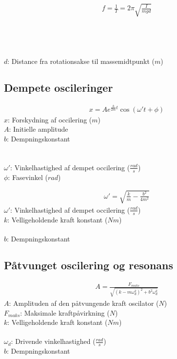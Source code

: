 	\begin{align}
		f=\frac{1}{T}=2\pi\sqrt{\frac{I}{mgd}}
	\end{align}
	\vinkelhast\\
	\masse\\
	\tyngde\\
	\inertimom\\
	$d$: Distance fra rotationsakse til massemidtpunkt ($m$)

\subsection{Dempete oscileringer}
	\begin{align}
		x=Ae^{\frac{b}{2m}t}\cos(\omega't+\phi)
	\end{align}
	$x$: Forskydning af occilering ($m$)\\
	$A$: Initielle amplitude\\
	$b$: Dempningskonstant\\
	\masse\\
	\tid\\
	$\omega'$: Vinkelhastighed af dempet occilering ($\frac{rad}{s}$)\\
	$\phi$: Fasevinkel ($rad$)

	\begin{align}
		\omega'=\sqrt{\frac{k}{m}-\frac{b^2}{4m^2}}
	\end{align}
	$\omega'$: Vinkelhastighed af dempet occilering ($\frac{rad}{s}$)\\
	$k$: Velligeholdende kraft konstant ($Nm$)\\
	\masse\\
	$b$: Dempningskonstant

\subsection{Påtvunget oscilering og resonans}
	\begin{align}
		A=\frac{F_{maks}}{\sqrt{(k-m\omega_d^2)^2+b^2\omega_d^2}}
	\end{align}
	$A$: Amplituden af den påtvungende kraft oscilator ($N$)\\
	$F_{maks}$: Maksimale kraftpåvirkning ($N$)\\
	$k$: Velligeholdende kraft konstant ($Nm$)\\
	\masse\\
	$\omega_d$: Drivende vinkelhastighed ($\frac{rad}{s}$)\\
	$b$: Dempningskonstant\\
